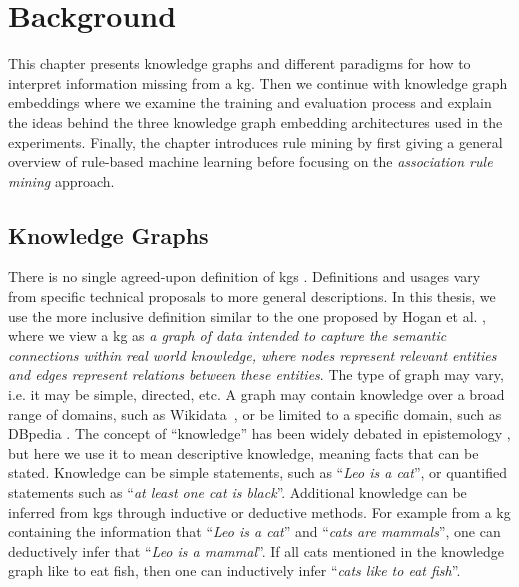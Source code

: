 \chapter{Background}

This chapter presents knowledge graphs and different paradigms for how to interpret information missing from a \gls{kg}. Then we continue with knowledge graph embeddings where we examine the training and evaluation process and explain the ideas behind the three knowledge graph embedding architectures used in the experiments. Finally, the chapter introduces rule mining by first giving a general overview of rule-based machine learning before focusing on the \textit{association rule mining} approach.

\section{Knowledge Graphs}
There is no single agreed-upon definition of \glspl{kg} \cite{bergman_2019, bonatti2019knowledge, ehrlinger2016towards}. Definitions and usages vary from specific technical proposals to more general descriptions. In this thesis, we use the more inclusive definition similar to the one proposed by Hogan et al. \cite{hogan2020knowledge}, where we view a \gls{kg} as \textit{a graph of data intended to capture the semantic connections within real world knowledge, where nodes represent relevant entities and edges represent relations between these entities}. The type of graph may vary, i.e. it may be simple, directed, etc. A graph may contain knowledge over a broad range of domains, such as Wikidata~\cite{lehmann2015dbpedia}, or be limited to a specific domain, such as DBpedia \cite{fellbaum2010wordnet}. The concept of ``knowledge'' has been widely debated in epistemology \cite{chappell2005plato, kirkham1984does, wittgenstein1969certainty, gottschalk2008internet}, but here we use it to mean descriptive knowledge, meaning facts that can be stated. Knowledge can be simple statements, such as ``\textit{Leo is a cat}'', or quantified statements such as ``\textit{at least one cat is black}''. %
Additional knowledge can be inferred from \glspl{kg} through inductive or deductive methods. For example from a \gls{kg} containing the information that ``\textit{Leo is a cat}'' and ``\textit{cats are mammals}'', one can deductively infer that ``\textit{Leo is a mammal}''. If all cats mentioned in the knowledge graph like to eat fish, then one can inductively infer ``\textit{cats like to eat fish}''.

